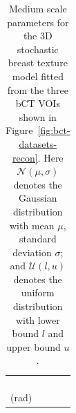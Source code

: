 \documentclass[journal]{IEEEtran}
\begin{document}
\begin{table}[!htb]
{\begin{center}
\begin{tabular}{ m{1.6cm} m{1.8cm} m{1.8cm} m{1.8cm} }
        \centering{$p_{L_b}$ (\si{\mm})}
        & \centering{$\mathcal{N}(2.77, 0.58)$}
        & \centering{$\mathcal{N}(2.75, 0.56)$}
        & \centering{$\mathcal{N}(2.79, 0.56)$}
          \tabularnewline%

        \cmidrule(lr){1-1} \cmidrule(lr){2-2}
        \cmidrule(lr){3-3} \cmidrule(lr){4-4}

        \centering{$p_{L_c}$ (\si{\mm})}
        & \centering{$\mathcal{N}(2.10, 0.57)$}
        & \centering{$\mathcal{N}(2.03, 0.52)$}
        & \centering{$\mathcal{N}(2.10, 0.54)$}
          \tabularnewline%

        \cmidrule(lr){1-1} \cmidrule(lr){2-2}
        \cmidrule(lr){3-3} \cmidrule(lr){4-4}

        \centering{$p_{\delta_{\phi_x}}$ (\si{\radian})}
        & \centering{$\mathcal{U}(-\frac{\pi}{2}, \frac{\pi}{2})$}
        & \centering{$\mathcal{U}(-\frac{\pi}{2}, \frac{\pi}{2})$}
        & \centering{$\mathcal{U}(-\frac{\pi}{2}, \frac{\pi}{2})$}
          \tabularnewline%

        \cmidrule(lr){1-1} \cmidrule(lr){2-2}
        \cmidrule(lr){3-3} \cmidrule(lr){4-4}

        \centering{$p_{\delta_{\phi_y}}$ (\si{\radian})}
        & \centering{$\mathcal{N}(-0.09, 0.4)$}
        & \centering{$\mathcal{N}(-0.15, 0.38)$}
        & \centering{$\mathcal{N}(-0.28, 0.47)$}
          \tabularnewline%

        \cmidrule(lr){1-1} \cmidrule(lr){2-2}
        \cmidrule(lr){3-3} \cmidrule(lr){4-4}

        \centering{$p_{\delta_{\phi_z}}$} (\si{\radian})}
        & \centering{$\mathcal{N}(0, 0.26)$}
        & \centering{$\mathcal{N}(0.01, 0.5)$}
        & \centering{$\mathcal{N}(-0.01, 0.43)$}
          \tabularnewline%

        \bottomrule

      \end{tabular}

      \caption{Medium scale parameters for the 3D stochastic breast
        texture model fitted from the three bCT VOIs shown in
        Figure~\ref{fig:bct-datasets-recon}. Here
        $\mathcal{N}(\mu, \sigma)$ denotes the Gaussian distribution
        with mean $\mu$, standard deviation $\sigma$; and
        $\mathcal{U}(l,u)$ denotes the uniform distribution with lower
        bound $l$ and upper bound $u$.}
      \label{tab:summary-inferred-params}
    \end{center}
  }
\end{table}
\end{document}
